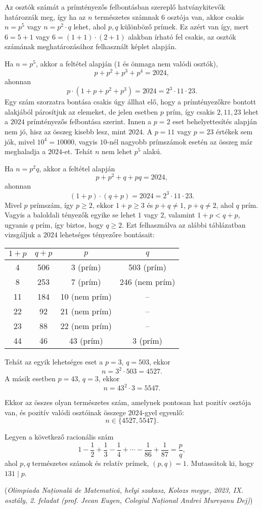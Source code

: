 \begin{solution}
Az osztók számát a prímtényezős felbontásban szereplő hatványkitevők
határozzák meg, így ha az $n$ természetes számnak $6$ osztója van,
akkor csakis $n=p^{5}$ vagy $n=p^{2}\cdot q$ lehet, ahol $p,q$
különböző prímek. Ez azért van így, mert $6=5+1$ vagy $6=(1+1)\cdot(2+1)$
alakban írható fel csakis, az osztók számának meghatározásához felhasznált
képlet alapján.

Ha $n=p^{5}$, akkor a feltétel alapján ($1$ és önmaga nem valódi
osztók), 
\[
p+p^{2}+p^{3}+p^{4}=2024,
\]
ahonnan 
\[
p\cdot(1+p+p^{2}+p^{3})=2024=2^{3}\cdot11\cdot23.
\]
Egy szám szorzatra bontása csakis úgy állhat elő, hogy a prímtényezőkre
bontott alakjából párosítjuk az elemeket, de jelen esetben $p$ prím,
így csakis $2,11,23$ lehet a $2024$ prímtényezős felbontása szerint.
Innen a $p=2$ eset behelyettesítés alapján nem jó, hisz az összeg
kisebb lesz, mint $2024$. A $p=11$ vagy $p=23$ értékek sem jók,
mivel $10^{4}=10000$, vagyis $10$-nél nagyobb prímszámok esetén
az összeg már meghaladja a $2024$-et. Tehát $n$ nem lehet $p^{5}$
alakú.

Ha $n=p^{2}q$, akkor a feltétel alapján 
\[
p+p^{2}+q+pq=2024,
\]
ahonnan 
\[
(1+p)\cdot(q+p)=2024=2^{3}\cdot11\cdot23.
\]
Mivel $p$ prímszám, így $p\geq2$, ekkor $1+p\geq3$ és $p+q\neq1$,
$p+q\neq2$, ahol $q$ prím. Vagyis a baloldali tényezők egyike se
lehet $1$ vagy $2$, valamint $1+p<q+p$, ugyanis $q$ prím, így
biztos, hogy $q\geq2$. Ezt felhasználva az alábbi táblázatban vizsgáljuk
a $2024$ lehetséges tényezőre bontásait:
\begin{center}
\begin{tabular}{|c|c|c|c|}
\hline 
$1+p$ & $q+p$ & $p$ & $q$\tabularnewline
\hline 
4 & 506 & 3 (prím) & 503 (prím)\tabularnewline
8 & 253 & 7 (prím) & 246 (nem prím)\tabularnewline
11 & 184 & 10 (nem prím) & --\tabularnewline
22 & 92 & 21 (nem prím) & --\tabularnewline
23 & 88 & 22 (nem prím) & --\tabularnewline
44 & 46 & 43 (prím) & 3 (prím)\tabularnewline
\hline 
\end{tabular}
\par\end{center}
\noindent Tehát az egyik lehetséges eset a $p=3$, $q=503$, ekkor
\[
n=3^{2}\cdot503=4527.
\]
A másik esetben $p=43$, $q=3$, ekkor 
\[
n=43^{2}\cdot3=5547.
\]

\noindent Ekkor az összes olyan természetes szám, amelynek pontosan
hat pozitív osztója van, és pozitív valódi osztóinak összege $2024$-gyel
egyenlő: 
\[
n\in\{4527,5547\}.
\]
\end{solution}
\begin{extraproblem}
Legyen a következő racionális szám 
\[
1-\frac{1}{2}+\frac{1}{3}-\frac{1}{4}+\cdots-\frac{1}{86}+\frac{1}{87}=\frac{p}{q},
\]
ahol $p,q$ természetes számok és relatív prímek, $(p,q)=1$. Mutassátok
ki, hogy $131\mid p$. 
\begin{flushright}
(\textit{Olimpiada Națională de Matematică, helyi szakasz, Kolozs
megye, 2023, IX. osztály, 2. feladat (prof. Jecan Eugen, Colegiul
Național Andrei Mureșanu Dej)}) 
\par\end{flushright}
\end{extraproblem}

